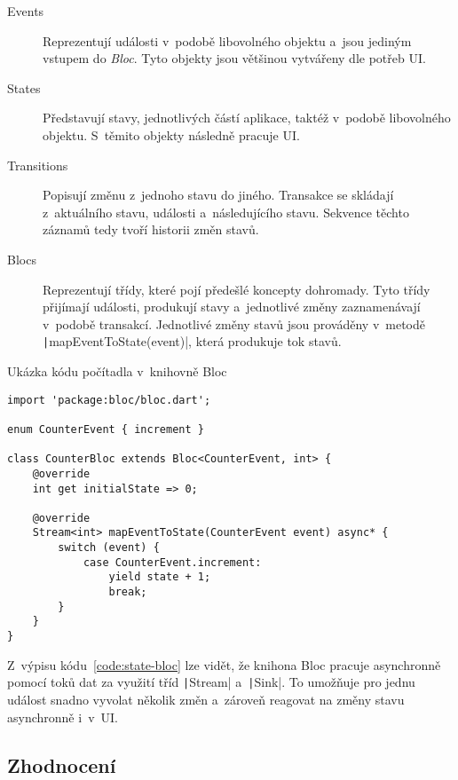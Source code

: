 \begin{description}
    \item[Events] Reprezentují události v~podobě libovolného objektu
    a~jsou jediným vstupem do \emph{Bloc}.
    Tyto objekty jsou většinou vytvářeny dle potřeb UI.
    \item[States] Představují stavy,
    jednotlivých částí aplikace,
    taktéž v~podobě libovolného objektu.
    S~těmito objekty následně pracuje UI.
    \item[Transitions] Popisují změnu z~jednoho stavu do jiného.
    Transakce se skládají z~aktuálního stavu, události a~následujícího stavu.
    Sekvence těchto záznamů tedy tvoří historii změn stavů.
    \item[Blocs] Reprezentují třídy,
    které pojí předešlé koncepty dohromady.
    Tyto třídy přijímají události, produkují stavy a~jednotlivé změny
    zaznamenávají v~podobě transakcí.
    Jednotlivé změny stavů jsou prováděny v~metodě
    \texttt|mapEventToState(event)|,
    která produkuje tok stavů.
\end{description}

\begin{listing}
    \caption{Ukázka kódu počítadla v~knihovně
    Bloc~\cite{bloclibrary_coreconcepts}}
    \label{code:state-bloc}
    \begin{verbatim}
import 'package:bloc/bloc.dart';

enum CounterEvent { increment }

class CounterBloc extends Bloc<CounterEvent, int> {
    @override
    int get initialState => 0;

    @override
    Stream<int> mapEventToState(CounterEvent event) async* {
        switch (event) {
            case CounterEvent.increment:
                yield state + 1;
                break;
        }
    }
}
    \end{verbatim}
\end{listing}

Z~výpisu kódu~\ref{code:state-bloc} lze vidět,
že knihona Bloc pracuje asynchronně pomocí toků dat za využití
tříd \texttt|Stream| a~\texttt|Sink|.
To umožňuje pro jednu událost snadno vyvolat několik změn
a~zároveň reagovat na změny stavu asynchronně i~v~UI.

\pagebreak
\subsection{Zhodnocení}

